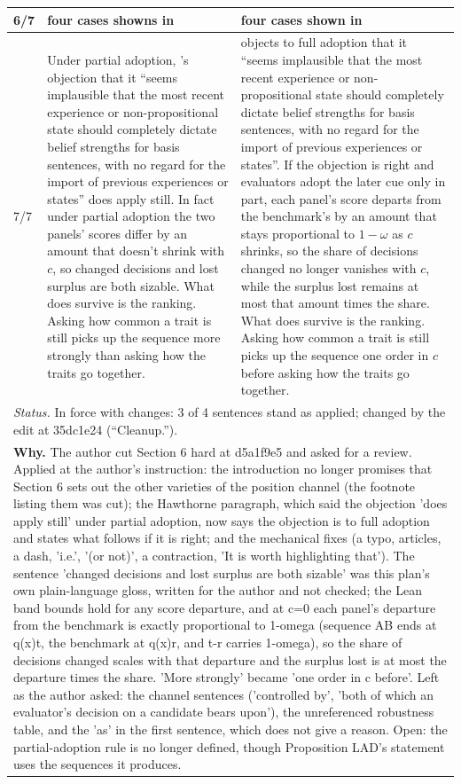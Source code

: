 \documentclass[10pt]{article}
\theoremstyle{definition}
\newlength{\fullw}\setlength{\fullw}{25.9cm}
\begin{document}
{\begin{longtable}{|p{0.9cm}|p{12.2cm}|p{12.2cm}|}
6/7 & four cases showns in & four cases shown in \\ \hline
7/7 & Under partial adoption, \citet{Hawthorne2004}'s objection that it ``seems implausible that the most recent experience or non-propositional state should completely dictate belief strengths for basis sentences, with no regard for the import of previous experiences or states'' does apply still. In fact under partial adoption the two panels' scores differ by an amount that doesn't shrink with $c$, so changed decisions and lost surplus are both sizable. What does survive is the ranking. Asking how common a trait is still picks up the sequence more strongly than asking how the traits go together. & \citet{Hawthorne2004} objects to full adoption that it ``seems implausible that the most recent experience or non-propositional state should completely dictate belief strengths for basis sentences, with no regard for the import of previous experiences or states''. If the objection is right and evaluators adopt the later cue only in part, each panel's score departs from the benchmark's by an amount that stays proportional to $1-\omega$ as $c$ shrinks, so the share of decisions changed no longer vanishes with $c$, while the surplus lost remains at most that amount times the share. What does survive is the ranking. Asking how common a trait is still picks up the sequence one order in $c$ before asking how the traits go together. \\ \hline
\multicolumn{3}{|p{\fullw}|}{\textit{Status.} In force with changes: 3 of 4 sentences stand as applied; changed by the edit at 35dc1e24 (``Cleanup.'').} \\ \hline
\multicolumn{3}{|p{\fullw}|}{\textbf{Why.} The author cut Section 6 hard at d5a1f9e5 and asked for a review. Applied at the author's instruction: the introduction no longer promises that Section 6 sets out the other varieties of the position channel (the footnote listing them was cut); the Hawthorne paragraph, which said the objection 'does apply still' under partial adoption, now says the objection is to full adoption and states what follows if it is right; and the mechanical fixes (a typo, articles, a dash, 'i.e.', '(or not)', a contraction, 'It is worth highlighting that'). The sentence 'changed decisions and lost surplus are both sizable' was this plan's own plain-language gloss, written for the author and not checked; the Lean band bounds hold for any score departure, and at c=0 each panel's departure from the benchmark is exactly proportional to 1-omega (sequence AB ends at q(x)t, the benchmark at q(x)r, and t-r carries 1-omega), so the share of decisions changed scales with that departure and the surplus lost is at most the departure times the share. 'More strongly' became 'one order in c before'. Left as the author asked: the channel sentences ('controlled by', 'both of which an evaluator's decision on a candidate bears upon'), the unreferenced robustness table, and the 'as' in the first sentence, which does not give a reason. Open: the partial-adoption rule is no longer defined, though Proposition LAD's statement uses the sequences it produces.} \\

\end{longtable}}
\end{document}
